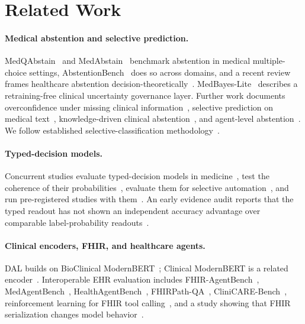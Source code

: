 \documentclass[11pt]{article}
\begin{document}
\section{Related Work}
\label{sec:related}

\paragraph{Medical abstention and selective prediction.}
MedQAbstain~\citep{cocchieri2026medqabstain} and MedAbstain~\citep{arxiv2601_12471} benchmark abstention in medical
multiple-choice settings, AbstentionBench~\citep{arxiv2506_09038} does so across domains, and a recent review
frames healthcare abstention decision-theoretically~\citep{presacan2026silence}. MedBayes-Lite~\citep{arxiv2511_16625}
describes a retraining-free clinical uncertainty governance layer. Further work documents overconfidence
under missing clinical information~\citep{arxiv2608_09080}, selective prediction on medical text~\citep{arxiv2502_18050},
knowledge-driven clinical abstention~\citep{arxiv2509_24816}, and agent-level abstention~\citep{arxiv2607_10059,arxiv2606_28733}.
We follow established selective-classification methodology~\citep{geifman2017selective,arxiv2407_01032,arxiv2410_15361}.

\paragraph{Typed-decision models.}
Concurrent studies evaluate typed-decision models in medicine~\citep{arxiv2609_34024}, test the coherence of
their probabilities~\citep{arxiv2609_33209}, evaluate them for selective automation~\citep{arxiv2609_33401}, and run
pre-registered studies with them~\citep{arxiv2609_34227}. An early evidence audit reports that the typed readout
has not shown an independent accuracy advantage over comparable label-probability readouts~\citep{arxiv2609_32160}.

\paragraph{Clinical encoders, FHIR, and healthcare agents.}
DAL builds on BioClinical ModernBERT~\citep{sounack2025bioclinicalmodernbert}; Clinical ModernBERT is a related
encoder~\citep{lee2025clinicalmodernbert}. Interoperable EHR evaluation includes FHIR-AgentBench~\citep{lee2026fhiragentbench},
MedAgentBench~\citep{jiang2025medagentbench}, HealthAgentBench~\citep{arxiv2606_31179}, FHIRPath-QA~\citep{arxiv2602_23479},
CliniCARE-Bench~\citep{arxiv2608_07796}, reinforcement learning for FHIR tool calling~\citep{arxiv2605_14126}, and a study
showing that FHIR serialization changes model behavior~\citep{arxiv2604_21076}.
\end{document}
